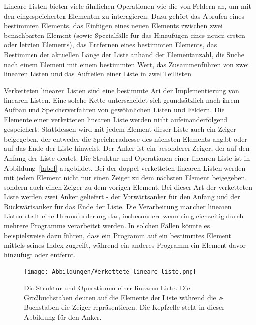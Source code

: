 Lineare Listen bieten viele ähnlichen Operationen wie die von Feldern an, um mit den eingespeicherten Elementen zu interagieren. Dazu gehört das Abrufen eines bestimmten Elements, das Einfügen eines neuen Elements zwischen zwei benachbarten Element (sowie Spezialfälle für das Hinzufügen eines neuen ersten oder letzten Elements), das Entfernen eines bestimmten Elements, das Bestimmen der aktuellen Länge der Liste anhand der Elementanzahl, die Suche nach einem Element mit einem bestimmten Wert, das Zusammenführen von zwei linearen Listen und das Aufteilen einer Liste in zwei Teillisten.\autocite[42-43]{ollmert_datenstrukturen_2020}


Verketteten linearen Listen sind eine bestimmte Art der Implementierung von linearen Listen. Eine solche Kette unterscheidet sich grundsätzlich nach ihrem Aufbau und Speicherverfahren von gewöhnlichen Listen und Feldern. Die Elemente einer verketteten linearen Liste werden nicht aufeinanderfolgend gespeichert. Stattdessen wird mit jedem Element dieser Liste auch ein Zeiger beigegeben, der entweder die Speicheradresse des nächsten Elements angibt oder auf das Ende der Liste hinweist. Der Anker ist ein besonderer Zeiger, der auf den Anfang der Liste deutet. Die Struktur und Operationen einer linearen Liste ist in Abbildung~\ref{label} abgebildet. Bei der doppel-verketteten linearen Listen werden mit jedem Element nicht nur einen Zeiger zu dem nächsten Element beigegeben, sondern auch einen Zeiger zu dem vorigen Element. Bei dieser Art der verketteten Liste werden zwei Anker geliefert - der Vorwärtsanker für den Anfang und der Rückwärtsanker für das Ende der Liste. Die Verarbeitung mancher linearen Listen stellt eine Herausforderung dar, insbesondere wenn sie gleichzeitig durch mehrere Programme verarbeitet werden. In solchen Fällen könnte es beispielsweise dazu führen, dass ein Programm auf ein bestimmtes Element mittels seines Index zugreift, während ein anderes Programm ein Element davor hinzufügt oder entfernt. \autocite[43-44]{ollmert_datenstrukturen_2020}

\begin{figure}[t]
	\texttt{[image: Abbildungen/Verkettete\_lineare\_liste.png]}
	\centering
	\caption[Lineare Liste]{Die Struktur und Operationen einer linearen Liste. Die Großbuchstaben deuten auf die Elemente der Liste während die \textit{z}-Buchstaben die Zeiger repräsentieren. Die Kopfzelle steht in dieser Abbildung für den Anker.\autocite[611]{ernst_grundkurs_2020}}
\end{figure}

